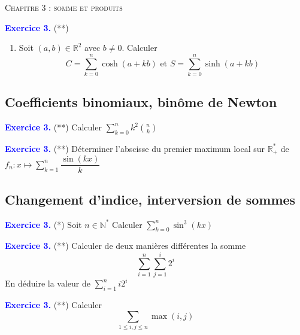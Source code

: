 \documentclass[a4paper,10pt]{article}
\renewcommand{\footrulewidth}{0.5pt} %
\begin{document}
 
\begin{multicols}{2}

\begin{center}\textsc{{\huge Chapitre 3 : somme et produits}}\end{center}

\chead{}\renewcommand{\headrulewidth}{0.4pt}\renewcommand{\footrulewidth}{0.4pt}




\textcolor{blue}{\large{\bf Exercice 3.}} (**)
\begin{enumerate}
\item Soit $(a,b) \in \mathbb{R}^2$ avec $b \neq 0$. Calculer
$$ C = \displaystyle\sum_{k=0}^{n}{\cosh(a+kb)} \text{ et } S = \displaystyle\sum_{k=0}^{n}{\sinh(a+kb)}$$
\end{enumerate}





\subsection*{Coefficients binomiaux, binôme de Newton}

\textcolor{blue}{\large{\bf Exercice 3.}} (**)
Calculer $\displaystyle\sum_{k=0}^{n}{k^2 {n \choose k}}$


\textcolor{blue}{\large{\bf Exercice 3.}} (**)
Déterminer l'abscisse du premier maximum local sur $\mathbb{R}_{+}^{*}$ de $f_n : x \longmapsto \displaystyle\sum_{k=1}^{n}{\dfrac{\sin(kx)}{k}}$


\subsection*{Changement d'indice, interversion de sommes}

\textcolor{blue}{\large{\bf Exercice 3.}} (*)
Soit $n \in \mathbb{N}^{*}$
Calculer $\displaystyle\sum_{k=0}^{n}{\sin^{3}(kx)}$

\textcolor{blue}{\large{\bf Exercice 3.}} (**)
Calculer de deux manières différentes la somme $$\displaystyle\sum_{i=1}^{n}{\displaystyle\sum_{j = 1}^{i}{2^i}}$$
En déduire la valeur de $\displaystyle\sum_{i=1}^{n}{i2^i}$

\textcolor{blue}{\large{\bf Exercice 3.}} (**)
Calculer $$\displaystyle\sum_{1 \leq i,j \leq n}{\max(i,j)}$$


\end{multicols}
\end{document}
